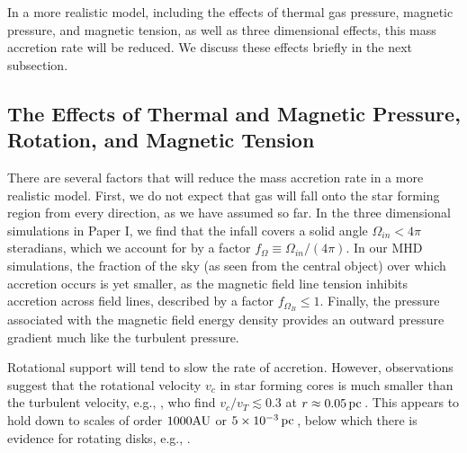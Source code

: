 \documentclass[iop,apj,numberedappendix]{emulateapj}
\newcommand       \be		{\begin{equation}}
\newcommand       \ee		{\end{equation}}
\newcommand       \pc		{\,{\rm pc \,}}
\newcommand       \etaeff       {\eta}
\newcommand       \tff          {\tau_{\rm ff}}
\begin{document}
%
In a more realistic model, including the effects of thermal gas
pressure, magnetic pressure, and magnetic tension, as well as three
dimensional effects, this mass accretion rate will be reduced. We
discuss these effects briefly in the next subsection.


\subsection{The Effects of Thermal and Magnetic Pressure, Rotation, and
  Magnetic Tension} There are several factors that will reduce the
mass accretion rate in a more realistic model. First, we do not expect
that gas will fall onto the star forming region from every direction,
as we have assumed so far. In the three dimensional simulations in
Paper I, we find that the infall covers a solid angle
$\Omega_{in}<4\pi$ steradians, which we account for by a factor
$f_\Omega\equiv\Omega_{in}/(4\pi)$. In our MHD simulations, the
fraction of the sky (as seen from the central object) over which
accretion occurs is yet smaller, as the magnetic field line tension
inhibits accretion across field lines, described by a factor
$f_{\Omega_B}\le1$. Finally, the pressure associated with the magnetic
field energy density provides an outward pressure gradient much like
the turbulent pressure.

Rotational support will tend to slow the rate of accretion. However,
observations suggest that the rotational velocity $v_c$ in star
forming cores is much smaller than the turbulent velocity, e.g.,
\citet{2011A&A...525A.151B,2014ApJ...785...42P}, who find
$v_c/v_T\lesssim0.3$ at $r\approx 0.05\pc$. This
appears to hold down to scales of order $1000{\rm AU}$ or
$5\times10^{-3}\pc$, below which there is evidence for rotating disks,
e.g., \citet{2000ApJ...537..283V}.
\end{document}
